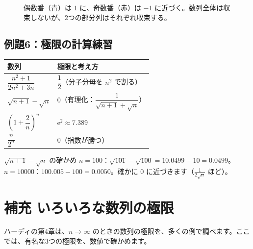 \documentclass[a4paper,11pt,openany]{ltjsbook}
\newcommand{\ee}{\mathrm{e}}
\begin{document}
\begin{figure}[htbp]
\centering
{}
\caption{偶数番（青）は $1$ に、奇数番（赤）は $-1$ に近づく。数列全体は収束しないが、2つの部分列はそれぞれ収束する。}
\end{figure}

\subsection*{例題6：極限の計算練習}

\begin{center}
\renewcommand{\arraystretch}{1.5}
\begin{tabular}{ll}
\toprule
数列 & 極限と考え方\\
\midrule
$\dfrac{n^2+1}{2n^2+3n}$ & $\dfrac12$（分子分母を $n^2$ で割る）\\
$\sqrt{n+1}-\sqrt n$ & $0$（有理化：$\dfrac{1}{\sqrt{n+1}+\sqrt n}$）\\
$\left(1+\dfrac{2}{n}\right)^n$ & $\ee^2\approx7.389$\\
$\dfrac{n}{2^n}$ & $0$（指数が勝つ）\\
\bottomrule
\end{tabular}
\end{center}

\begin{examplebox}{$\sqrt{n+1}-\sqrt n$ の確かめ}
$n=100$：$\sqrt{101}-\sqrt{100}=10.0499-10=0.0499$。$n=10000$：$100.005-100=0.0050$。確かに $0$ に近づきます（$\frac{1}{2\sqrt n}$ ほど）。
\end{examplebox}

\section{補充 いろいろな数列の極限}

ハーディの第4章は、$n\to\infty$ のときの数列の極限を、多くの例で調べます。ここでは、有名な3つの極限を、数値で確かめます。
\end{document}

